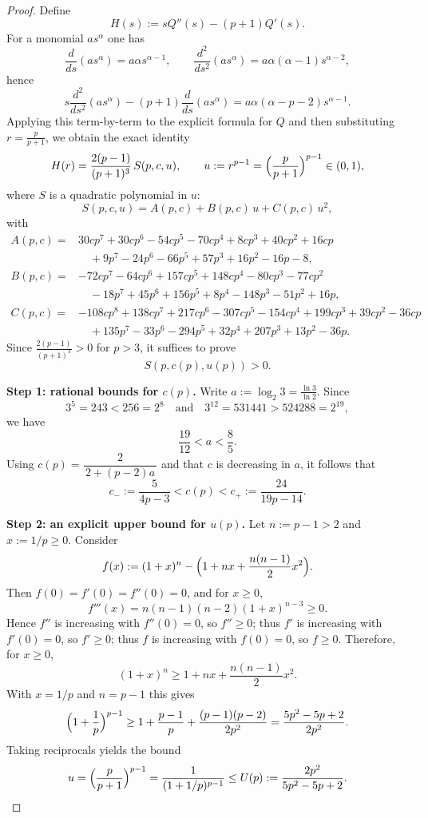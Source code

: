 \documentclass[10pt,a4paper]{amsart}
\begin{document}
\begin{proof}
Define
\[
H(s):=sQ''(s)-(p+1)Q'(s).
\]
For a monomial $a s^\alpha$ one has
\[
\frac{d}{ds}(a s^\alpha)=a\alpha s^{\alpha-1},\qquad
\frac{d^2}{ds^2}(a s^\alpha)=a\alpha(\alpha-1)s^{\alpha-2},
\]
hence
\[
s\frac{d^2}{ds^2}(a s^\alpha)-(p+1)\frac{d}{ds}(a s^\alpha)
= a\alpha(\alpha-p-2)s^{\alpha-1}.
\]
Applying this term-by-term to the explicit formula for $Q$ and then substituting
$r=\frac{p}{p+1}$, we obtain the exact identity
\begin{equation}\label{eq:H-reduction}
H(r)=\frac{2(p-1)}{(p+1)^3}\,S(p,c,u),
\qquad
u:=r^{p-1}=\Bigl(\frac{p}{p+1}\Bigr)^{p-1}\in(0,1),
\end{equation}
where $S$ is a quadratic polynomial in $u$:
\[
S(p,c,u)=A(p,c)+B(p,c)\,u+C(p,c)\,u^2,
\]
with
\begin{align*}
A(p,c)={}&
30cp^7+30cp^6-54cp^5-70cp^4+8cp^3+40cp^2+16cp\\
&\quad +9p^7-24p^6-66p^5+57p^3+16p^2-16p-8,\\[2mm]
B(p,c)={}&
-72cp^7-64cp^6+157cp^5+148cp^4-80cp^3-77cp^2\\
&\quad -18p^7+45p^6+156p^5+8p^4-148p^3-51p^2+16p,\\[2mm]
C(p,c)={}&
-108cp^8+138cp^7+217cp^6-307cp^5-154cp^4+199cp^3+39cp^2-36cp\\
&\quad +135p^7-33p^6-294p^5+32p^4+207p^3+13p^2-36p.
\end{align*}
Since $\frac{2(p-1)}{(p+1)^3}>0$ for $p>3$, it suffices to prove
\begin{equation}\label{eq:S-positive-goal}
S(p,c(p),u(p))>0.
\end{equation}

\medskip
\noindent\textbf{Step 1: rational bounds for $c(p)$.}
Write $a:=\log_2 3=\frac{\ln 3}{\ln 2}$. Since
\[
3^5=243<256=2^8
\quad\text{and}\quad
3^{12}=531441>524288=2^{19},
\]
we have
\[
\frac{19}{12}<a<\frac85.
\]
Using $c(p)=\dfrac{2}{\,2+(p-2)a\,}$ and that $c$ is decreasing in $a$, it follows that
\begin{equation}\label{eq:c-bounds-sharp}
c_-:=\frac{5}{4p-3}<c(p)<c_+:=\frac{24}{19p-14}.
\end{equation}

\medskip
\noindent\textbf{Step 2: an explicit upper bound for $u(p)$.}
Let $n:=p-1>2$ and $x:=1/p\ge 0$. Consider
\[
f(x):=(1+x)^n-\Bigl(1+nx+\frac{n(n-1)}{2}x^2\Bigr).
\]
Then $f(0)=f'(0)=f''(0)=0$, and for $x\ge0$,
\[
f'''(x)=n(n-1)(n-2)(1+x)^{n-3}\ge 0.
\]
Hence $f''$ is increasing with $f''(0)=0$, so $f''\ge0$; thus $f'$ is increasing
with $f'(0)=0$, so $f'\ge0$; thus $f$ is increasing with $f(0)=0$, so $f\ge0$.
Therefore, for $x\ge0$,
\[
(1+x)^n\ge 1+nx+\frac{n(n-1)}{2}x^2.
\]
With $x=1/p$ and $n=p-1$ this gives
\[
\Bigl(1+\frac1p\Bigr)^{p-1}
\ge
1+\frac{p-1}{p}+\frac{(p-1)(p-2)}{2p^2}
=
\frac{5p^2-5p+2}{2p^2}.
\]
Taking reciprocals yields the bound
\begin{equation}\label{eq:u-upper}
u=\Bigl(\frac{p}{p+1}\Bigr)^{p-1}
=\frac{1}{(1+1/p)^{p-1}}
\le
U(p):=\frac{2p^2}{5p^2-5p+2}.
\end{equation}


\end{proof}
\end{document}
